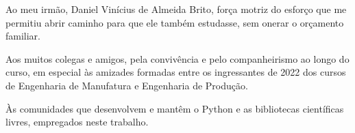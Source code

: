 Ao meu irmão, Daniel Vinícius de Almeida Brito, força motriz do esforço que me permitiu abrir caminho para que ele também estudasse, sem onerar o orçamento familiar.

Aos muitos colegas e amigos, pela convivência e pelo companheirismo ao longo do curso, em especial às amizades formadas entre os ingressantes de 2022 dos cursos de Engenharia de Manufatura e Engenharia de Produção.

Às comunidades que desenvolvem e mantêm o Python e as bibliotecas científicas livres, empregados neste trabalho.
\par\endgroup

%
